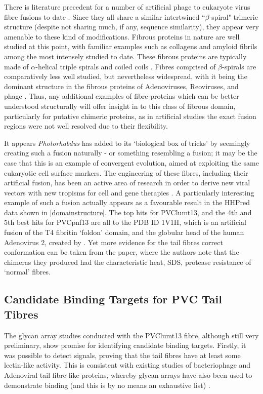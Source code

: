 There is literature precedent for a number of artificial phage to eukaryote virus fibre fusions to date \citep{Papanikolopoulou2004a, Papanikolopoulou2004, Krasnykh2001}. Since they all share a similar intertwined ``$\beta$-spiral" trimeric structure (despite not sharing much, if any, sequence similarity), they appear very amenable to these kind of modifications. Fibrous proteins in nature are well studied at this point, with familiar examples such as collagens and amyloid fibrils among the most intensely studied to date. These fibrous proteins are typically made of $\alpha$-helical triple spirals and coiled coils \citep{Beck1998}. Fibres comprised of $\beta$-spirals are comparatively less well studied, but nevertheless widespread, with it being the dominant structure in the fibrous proteins of Adenoviruses, Reoviruses, and phage \citep{Papanikolopoulou2004, Papanikolopoulou2004a}. Thus, any additional examples of fibre proteins which can be better understood structurally will offer insight in to this class of fibrous domain, particularly for putative chimeric proteins, as in artificial studies the exact fusion regions were not well resolved due to their flexibility.

It appears \emph{Photorhabdus} has added to its `biological box of tricks' by seemingly creating such a fusion naturally - or something resembling a fusion; it may be the case that this is an example of convergent evolution, aimed at exploiting the same eukaryotic cell surface markers. The engineering of these fibres, including their artificial fusion, has been an active area of research in order to derive new viral vectors with new tropisms for cell and gene therapies \citep{Krasnykh2001, Li2006}. A particularly interesting example of such a fusion actually appears as a favourable result in the HHPred data shown in \vref{domainstructure}. The top hits for PVClumt13, and the 4th and 5th best hits for PVCpnf13 are all to the PDB ID 1V1H, which is an artificial fusion of the T4 fibritin `foldon' domain, and the globular head of the human Adenovirus 2, created by \cite{Papanikolopoulou2004}. Yet more evidence for the tail fibres correct conformation can be taken from the paper, where the authors note that the chimeras they produced had the characteristic heat, SDS, protease resistance of `normal' fibres.


\subsection{Candidate Binding Targets for PVC Tail Tibres}
The glycan array studies conducted with the PVClumt13 fibre, although still very preliminary, show promise for identifying candidate binding targets. Firstly, it was possible to detect signals, proving that the tail fibres have at least some lectin-like activity. This is consistent with existing studies of bacteriophage and Adenoviral tail fibre-like proteins, whereby glycan arrays have also been used to demonstrate binding (and this is by no means an exhaustive list) \citep{Guardado-Calvo2010, Singh2015, Lenman2018, Nilsson2011}.

